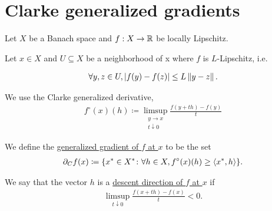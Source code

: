 \section{Clarke generalized gradients}\label{sec:clarke_gradients}

Let $X$ be a Banach space and $f: X \to \mathbb R$ be locally Lipschitz.

\begin{definition}\label{def:clarke_gradient}\cite[definition 10.3]{Clarke2013}
  Let $x \in X$ and $U \subseteq X$ be a neighborhood of x where $f$ is $L$-Lipschitz, i.e.

  \begin{align*}
    \forall y, z \in U, \left\vert f(y) - f(z) \right\vert \leq L \left\Vert y - z \right\Vert.
  \end{align*}

  We use the Clarke generalized derivative,
  \begin{align*}
    f^\circ(x)(h) \coloneqq \limsup_{\substack{y \to x \\ t \downarrow 0}} \frac {f(y + th) - f(y)} t
  \end{align*}

  We define the \ul{generalized gradient of $f$ at $x$} to be the set
  \begin{align*}
    \partial_C f(x) \coloneqq \{ x^* \in X^* \colon \forall h \in X, f^\circ(x)(h) \geq \left\langle x^*, h \right\rangle \}.
  \end{align*}

  We say that the vector $h$ is a \ul{descent direction of $f$ at $x$} if
  \begin{align*}
    \limsup_{t \downarrow 0} \frac {f(x + th) - f(x)} t < 0.
  \end{align*}
\end{definition}

